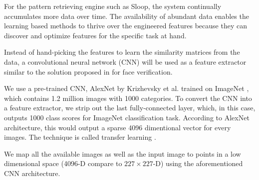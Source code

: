 For the pattern retrieving engine such as Sloop, the system continually
accumulates more data over time. The availability of abundant data enables the
learning based methods to thrive over the engineered features because they can
discover and optimize features for the specific task at hand.

Instead of hand-picking the features to learn the similarity matrices from the
data, a convolutional neural network (CNN) will be used as a feature extractor
similar to the solution proposed in \cite{chopra05} for face verification.

We use a pre-trained CNN, AlexNet by Krizhevsky et al. \cite{kriz12} trained on
ImageNet \cite{imagenet}, which contains 1.2 million images with 1000
categories. To convert the CNN into a feature extractor, we strip out the last
fully-connected layer, which, in this case, outputs 1000 class scores for
ImageNet classification task. According to AlexNet architecture, this would
output a sparse 4096 dimentional vector for every images. The technique is
called transfer learning \cite{transfer}.

We map all the available images as well as the input image to points in a low
dimensional space (4096-D compare to $227 \times 227$-D) using the
aforementioned CNN architecture. 


